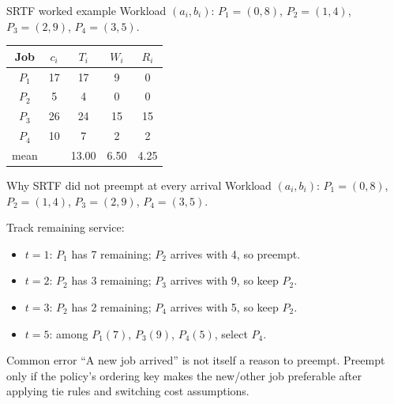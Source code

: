\documentclass[aspectratio=169,11pt]{beamer}
\begin{document}
\begin{frame}{SRTF worked example}
  Workload $(a_i,b_i)$: $P_1=(0,8)$, $P_2=(1,4)$, $P_3=(2,9)$, $P_4=(3,5)$.
  \begin{center}
  \end{center}
  \small
  \renewcommand{\arraystretch}{1.15}
  \begin{tabularx}{\textwidth}{@{}*{5}{C}@{}}
    \toprule
    \textbf{Job} & $c_i$ & $T_i$ & $W_i$ & $R_i$ \\
    \midrule
    $P_1$ & 17 & 17 & 9  & 0 \\
    $P_2$ & 5  & 4  & 0  & 0 \\
    $P_3$ & 26 & 24 & 15 & 15 \\
    $P_4$ & 10 & 7  & 2  & 2 \\
    \midrule
    mean & & 13.00 & 6.50 & 4.25 \\
    \bottomrule
  \end{tabularx}
\end{frame}

\begin{frame}{Why SRTF did not preempt at every arrival}
  \small Workload $(a_i,b_i)$: $P_1=(0,8)$, $P_2=(1,4)$, $P_3=(2,9)$, $P_4=(3,5)$.
  \par\medskip
  Track remaining service:
  \begin{itemize}
    \item $t=1$: $P_1$ has 7 remaining; $P_2$ arrives with 4, so preempt.
    \item $t=2$: $P_2$ has 3 remaining; $P_3$ arrives with 9, so keep $P_2$.
    \item $t=3$: $P_2$ has 2 remaining; $P_4$ arrives with 5, so keep $P_2$.
    \item $t=5$: among $P_1(7)$, $P_3(9)$, $P_4(5)$, select $P_4$.
  \end{itemize}
  \begin{alertblock}{Common error}
    ``A new job arrived'' is not itself a reason to preempt. Preempt only if the policy's ordering key makes the new/other job preferable after applying tie rules and switching cost assumptions.
  \end{alertblock}
\end{frame}
\end{document}
